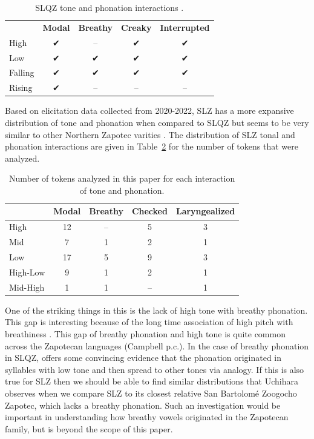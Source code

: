 \documentclass[12pt, letterpaper]{article}
\providecommand{\lsptoprule}{\midrule\toprule}
\providecommand{\lspbottomrule}{\bottomrule\midrule}
\begin{document}
\begin{table}[!ht]
	\centering
	\caption{SLQZ tone and phonation interactions \citep{chavez-peonInteractionMetricalStructure2010}.}
	\label{tab:SLQZ}
	 \begin{tabular}{lcccc}
	  \lsptoprule
					  &	 \textbf{Modal}  & \textbf{Breathy} & \textbf{Creaky} & \textbf{Interrupted} \\
		  High	& ✔︎ & -- & ✔︎ & ✔︎ \\
		  Low & ✔︎ & ✔︎ & ✔︎ & ✔︎ \\
		  Falling & ✔︎ & ✔︎ & ✔︎ & ✔︎ \\
		  Rising & ✔︎ & -- & -- & -- \\
	  \lspbottomrule
	 \end{tabular}
\end{table}

Based on elicitation data collected from 2020-2022, SLZ has a more expansive distribution of tone and phonation when compared to SLQZ but seems to be very similar to other Northern Zapotec varities \citep[e.g.,][]{avelinobecerraTopicsYalalagZapotec2004}. The distribution of SLZ tonal and phonation interactions are given in Table~\ref{tab:ToneVoiceQuality} for the number of tokens that were analyzed. 
\begin{table}[!h]
	\caption{Number of tokens analyzed in this paper for each interaction of tone and phonation.}
	\label{tab:ToneVoiceQuality}
	\centering

	\begin{tabular}{lcccc}
	\lsptoprule
		& \textbf{Modal} & \textbf{Breathy} & \textbf{Checked} & \textbf{Laryngealized} \\
	\hline
	High		& 12 & -- & 5	& 3 \\
	Mid			& 7 & 1  & 2	& 1 \\
	Low			& 17 & 5  & 9	& 3 \\
	High-Low	& 9 & 1  & 2	& 1 \\
	Mid-High	& 1	 & 1  & --	& 1 \\
	\lspbottomrule
	\end{tabular}
\end{table}

One of the striking things in this is the lack of high tone with breathy phonation. This gap is interesting because of the long time association of high pitch with breathiness \citep[a good overview–of this association and other phoantion types–is found in][]{eslingVoiceQualityLaryngeal2019}. This gap of breathy phonation and high tone is quite common across the Zapotecan languages (Campbell p.c.). In the case of breathy phonation in SLQZ, \citet{uchiharaToneRegistrogenesisQuiavini2016} offers some convincing evidence that the phonation originated in syllables with low tone and then spread to other tones via analogy. If this is also true for SLZ then we should be able to find similar distributions that Uchihara observes when we compare SLZ to its closest relative San Bartolomé Zoogocho Zapotec, which lacks a breathy phonation. Such an investigation would be important in understanding how breathy vowels originated in the Zapotecan family, but is beyond the scope of this paper.  
\end{document}
